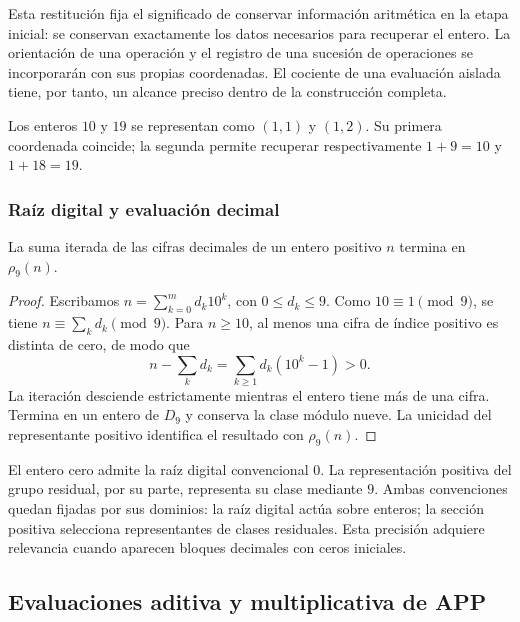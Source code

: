 Esta restitución fija el significado de conservar información aritmética en la etapa inicial: se conservan exactamente los datos necesarios para recuperar el entero. La orientación de una operación y el registro de una sucesión de operaciones se incorporarán con sus propias coordenadas. El cociente de una evaluación aislada tiene, por tanto, un alcance preciso dentro de la construcción completa.

\begin{ejemplo}
Los enteros $10$ y $19$ se representan como $(1,1)$ y $(1,2)$. Su primera coordenada coincide; la segunda permite recuperar respectivamente $1+9=10$ y $1+18=19$.
\end{ejemplo}

\subsubsection{Raíz digital y evaluación decimal}

\begin{bloqueindivisible}
\begin{proposicion}
\label{prop:app-raiz-digital}
La suma iterada de las cifras decimales de un entero positivo $n$ termina en $\rho_9(n)$.
\end{proposicion}

\begin{proof}
Escribamos $n=\sum_{k=0}^{m}d_k10^k$, con $0\leq d_k\leq9$. Como $10\equiv1\pmod9$, se tiene $n\equiv\sum_kd_k\pmod9$. Para $n\geq10$, al menos una cifra de índice positivo es distinta de cero, de modo que
\[
 n-\sum_kd_k=\sum_{k\geq1}d_k(10^k-1)>0.
\]
La iteración desciende estrictamente mientras el entero tiene más de una cifra. Termina en un entero de $D_9$ y conserva la clase módulo nueve. La unicidad del representante positivo identifica el resultado con $\rho_9(n)$.
\end{proof}
\end{bloqueindivisible}

El entero cero admite la raíz digital convencional $0$. La representación positiva del grupo residual, por su parte, representa su clase mediante $9$. Ambas convenciones quedan fijadas por sus dominios: la raíz digital actúa sobre enteros; la sección positiva selecciona representantes de clases residuales. Esta precisión adquiere relevancia cuando aparecen bloques decimales con ceros iniciales.

\subsection{Evaluaciones aditiva y multiplicativa de APP}
\label{sec:app-evaluaciones}

